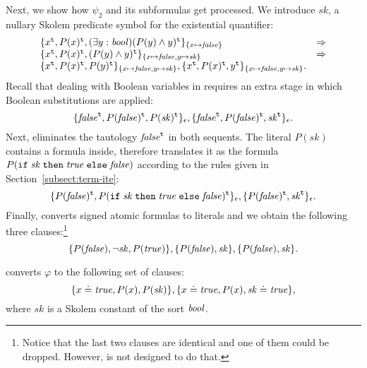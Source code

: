 \begin{example*}
Next, we show how $\psi_2$ and its subformulas get processed. 
We introduce $\mathit{sk}$, a nullary Skolem predicate symbol for the existential quantifier:
\[
\begin{array}{ll}
\{x^{\mathtt{t}}, P(x)^{\mathtt{t}}, (\exists y:\mathit{bool})(P(y) \land y)^{\mathtt{t}}\}_{\{x \mapsto \mathit{false}\}} & \Rightarrow\\
\{x^{\mathtt{t}}, P(x)^{\mathtt{t}}, (P(y) \land y)^{\mathtt{t}}\}_{\{x \mapsto \mathit{false}, y \mapsto \mathit{sk}\}} & \Rightarrow\\
\{x^{\mathtt{t}}, P(x)^{\mathtt{t}}, P(y)^{\mathtt{t}}\}_{\{x \mapsto \mathit{false}, y \mapsto \mathit{sk}\}}, 
\{x^{\mathtt{t}}, P(x)^{\mathtt{t}}, y^{\mathtt{t}}\}_{\{x \mapsto \mathit{false}, y \mapsto \mathit{sk}\}}.
\end{array}
\]
Recall that dealing with Boolean variables in \nfcnf{} requires an extra stage in which Boolean substitutions are applied:
\[
\{\mathit{false}^{\mathtt{t}}, P(\mathit{false})^{\mathtt{t}}, P(\mathit{sk})^{\mathtt{t}}\}_\epsilon, 
\{\mathit{false}^{\mathtt{t}}, P(\mathit{false})^{\mathtt{t}}, \mathit{sk}^{\mathtt{t}}\}_\epsilon.
\]
Next, \nfcnf{} eliminates the tautology ${\mathit{false}}^{\mathtt{t}}$ in both sequents. The literal $P(\mathit{sk})$ contains a formula inside, therefore \nfcnf{} translates it as the formula $P(\mathtt{if}\;{\mathit{sk}}\;\allowbreak\mathtt{then}\;{\mathit{true}}\;\allowbreak\mathtt{else}\;{\mathit{false}})$ according to the rules given in Section~\ref{subsect:term-ite}:
\[
\{P(\mathit{false})^{\mathtt{t}}, P(\mathtt{if}\;{\mathit{sk}}\;\allowbreak\mathtt{then}\;{\mathit{true}}\;\allowbreak\mathtt{else}\;{\mathit{false}})^{\mathtt{t}}\}_\epsilon, 
\{P(\mathit{false})^{\mathtt{t}}, \mathit{sk}^{\mathtt{t}}\}_\epsilon.
\]
Finally, \nfcnf{} converts signed atomic formulas to literals and we obtain the following three clauses:\footnote{Notice that the last two clauses are identical and one of them could be dropped. 
However, \nfcnf{} is not designed to do that.}
\[
\{P(\mathit{false}), \neg \mathit{sk}, P(\mathit{true})\}, \{P(\mathit{false}), \mathit{sk}\}, \{P(\mathit{false}), \mathit{sk}\}.
\]

\oldcnf{} converts $\varphi$ to the following set of clauses:
$$\{ x \doteq \mathit{true}, P(x), P(\mathit{sk}) \}, \{ x \doteq \mathit{true}, P(x), \mathit{sk}\doteq \mathit{true} \},$$
where $\mathit{sk}$ is a Skolem constant of the sort $\mathit{bool}$.
\QED\end{example*}

